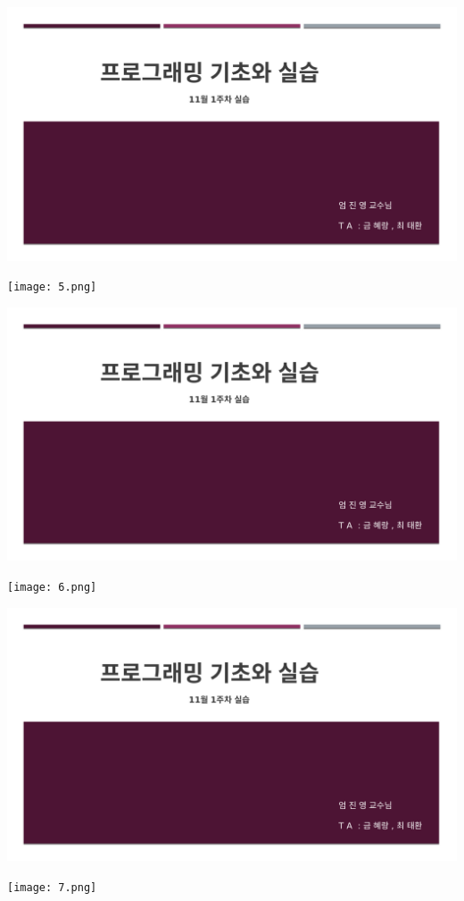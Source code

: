 \documentclass[11pt,a4paper]{article}
\begin{document}
\begin{enumerate}
\includegraphics[page=6, width=\textwidth]{1.pdf}
	
\texttt{[image: 5.png]}	


\includegraphics[page=7, width=\textwidth]{1.pdf}

\texttt{[image: 6.png]}	

\includegraphics[page=8, width=\textwidth]{1.pdf}

\texttt{[image: 7.png]}	
\end{enumerate}
\end{document}
